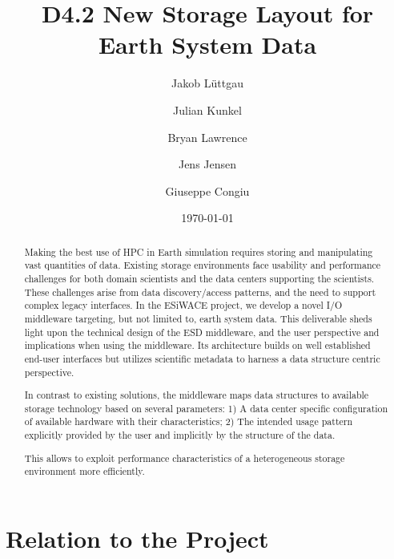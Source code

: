 \documentclass{../../template/esiwace-report}
\title{D4.2 New Storage Layout for Earth System Data}
\author{Jakob Lüttgau 
\and Julian Kunkel
\and Bryan Lawrence
\and Jens Jensen
\and Giuseppe Congiu
}
\date{\today} %
\begin{document}
\maketitle
\begin{abstract}
Making the best use of HPC in Earth simulation requires storing and manipulating vast quantities of data.
Existing storage environments face usability and performance challenges for both domain scientists and the data centers supporting the scientists.
These challenges arise from data discovery/access patterns, and the need to support complex legacy interfaces.
In the ESiWACE project, we develop a novel I/O middleware targeting, but not limited to, earth system data.
This deliverable sheds light upon the technical design of the ESD middleware, and the user perspective and implications when using the middleware.
Its architecture builds on well established end-user interfaces but utilizes scientific metadata to harness a data structure centric perspective. 

In contrast to existing solutions, the middleware maps data structures to available storage technology based on several parameters:
1) A data center specific configuration of available hardware with their characteristics;
2) The intended usage pattern explicitly provided by the user and implicitly by the structure of the data.

This allows to exploit performance characteristics of a heterogeneous storage environment more efficiently.
\end{abstract}
\newpage
\tableofcontents
\newpage
\chapter{Relation to the Project}
\end{document}
